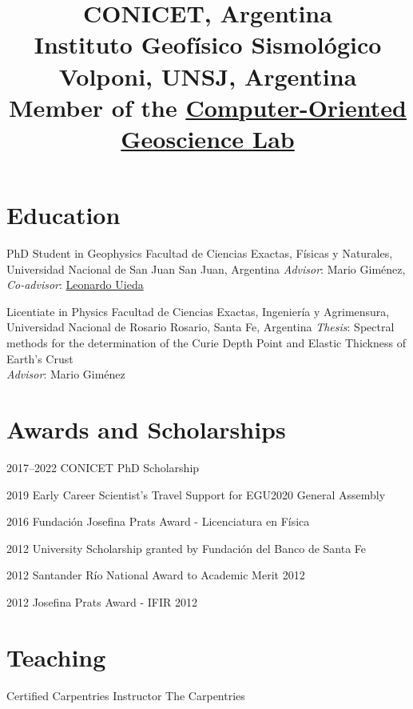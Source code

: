 \documentclass[a4paper,12pt,sans]{moderncv/moderncv}
\title{
    \small
    CONICET, Argentina
    \\
    Instituto Geofísico Sismológico Volponi, UNSJ, Argentina
    \\
    Member of the
    \href{https://www.compgeolab.org}{Computer-Oriented Geoscience Lab}
}
\newcommand{\leo}{\href{https://www.leouieda.com}{Leonardo Uieda}}
\newcommand{\mario}{Mario Giménez}
\begin{document}
\maketitle


\section{Education}

{PhD Student in Geophysics}
{
    Facultad de Ciencias Exactas, Físicas y Naturales,
    Universidad Nacional de San Juan
}
{San Juan, Argentina}
{}
{\emph{Advisor}: \mario{}, \emph{Co-advisor}: \leo{}}

{Licentiate in Physics}
{
    Facultad de Ciencias Exactas, Ingeniería y Agrimensura,
    Universidad Nacional de Rosario
}
{Rosario, Santa Fe, Argentina}
{}
{
    \emph{Thesis}: Spectral methods for the determination of the Curie Depth
    Point and Elastic Thickness of Earth's Crust
    \\
    \emph{Advisor}: \mario{}
}


\section{Awards and Scholarships}

\cvline
{2017--2022}
{CONICET PhD Scholarship}

\cvline
{2019}
{Early Career Scientist's Travel Support for EGU2020 General Assembly}

\cvline
{2016}
{Fundación Josefina Prats Award - Licenciatura en Física}

\cvline
{2012}
{University Scholarship granted by Fundación del Banco de Santa Fe}

\cvline
{2012}
{Santander Río National Award to Academic Merit 2012}

\cvline
{2012}
{Josefina Prats Award - IFIR 2012}



\section{Teaching}

{Certified Carpentries Instructor} %
{The Carpentries} %
{} %
{} %
{} %
\end{document}
